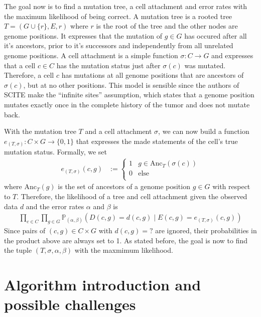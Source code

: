 The goal now is to find a mutation tree, a cell attachment and error rates with the maximum likelihood of being correct. A mutation tree is a rooted tree $T = (G \cup \{r\}, E, r)$ where $r$ is the root of the tree and the other nodes are genome positions. It expresses that the mutation of $g \in G$ has occured after all it's ancestors, prior to it's successors and independently from all unrelated genome positions. A cell attachment is a simple function $\sigma: C \rightarrow G$ and expresses that a cell $c \in C$ has the mutation status just after $\sigma(c)$ was mutated. Therefore, a cell $c$ has mutations at all genome positions that are ancestors of $\sigma(c)$, but at no other positions. This model is sensible since the authors of \ac{SCITE} make the ``infinite sites'' assumption, which states that a genome position mutates exactly once in the complete history of the tumor and does not mutate back.

With the mutation tree $T$ and a cell attachment $\sigma$, we can now build a function $e_{(T, \sigma)}: C \times G \rightarrow \{0, 1\}$ that expresses the made statements of the cell's true mutation status. Formally, we set
\begin{align*}
    e_{(T, \sigma)}(c, g) &:= \begin{cases}
        1 & g \in \mathrm{Anc}_T(\sigma(c)) \\
        0 & \text{else} \\
    \end{cases}
\end{align*}
where $\mathrm{Anc}_T(g)$ is the set of ancestors of a genome position $g \in G$ with respect to $T$. Therefore, the likelihood of a tree and cell attachment given the observed data $d$ and the error rates $\alpha$ and $\beta$ is
\begin{align*}
    \prod_{c \in C}\prod_{g \in G} \mathbb{P}_{(\alpha, \beta)}(D(c, g) = d(c, g) \mid E(c, g) = e_{(T, \sigma)}(c, g))
\end{align*}
Since pairs of $(c, g) \in C \times G$ with $d(c, g) = ?$ are ignored, their probabilities in the product above are always set to 1. As stated before, the goal is now to find the tuple $(T, \sigma, \alpha, \beta)$ with the maxmimum likelihood.

\section{Algorithm introduction and possible challenges}

